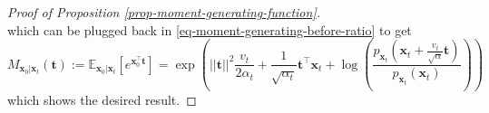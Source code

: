 \begin{proof}[Proof of Proposition \ref{prop-moment-generating-function}]
\begin{equation}
\end{equation}
which can be plugged back in \eqref{eq-moment-generating-before-ratio} to get
\begin{equation}
    M_{\mathbf{x}_{0}\vert\mathbf{x}_{t}}(\mathbf{t}) := \mathbb{E}_{\mathbf{x}_{0}\vert\mathbf{x}_{t}}[e^{\mathbf{x}_0^{\top} \mathbf{t}}] = \exp\left(||\mathbf{t}||^2\frac{v_{t}}{2\alpha_{t}} + \frac{1}{\sqrt{\alpha_{t}}}\mathbf{t}^{\top}\mathbf{x}_{t} + \log\left(\frac{p_{\mathbf{x}_t}\left(\mathbf{x}_{t}+\frac{v_{t}}{\sqrt{\alpha}}\mathbf{t}\right)}{p_{\mathbf{x}_t}\left(\mathbf{x}_{t}\right)}\right)\right)
\end{equation}
which shows the desired result.
\end{proof}



